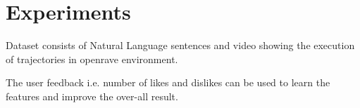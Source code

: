 \section{Experiments}

Dataset consists of Natural Language sentences and video showing the execution
of trajectories in openrave environment. 

The user feedback i.e. number of likes and dislikes can be used to learn the
features and improve the over-all result. 
